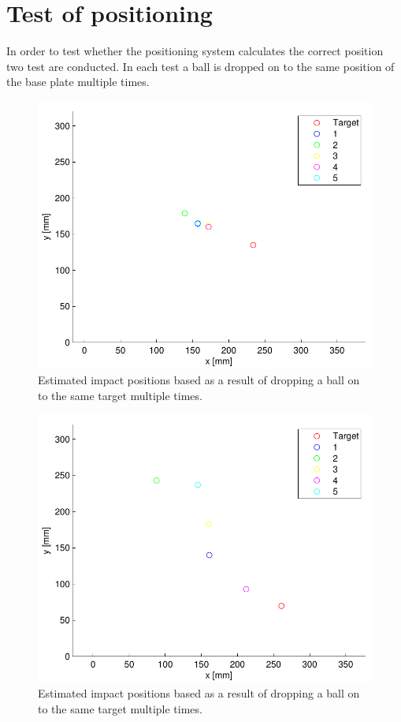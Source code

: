 \section{Test of positioning}
\label{test}
In order to test whether the positioning system calculates the correct position two test are conducted.
In each test a ball is dropped on to the same position of the base plate multiple times. 

\begin{figure}[htb]
	\centering
	\includegraphics[width=.8\textwidth]{figures/testRes30deg}
	\caption{Estimated impact positions based as a result of dropping a ball on to the same target multiple times.}
	\label{fig:testResult30Deg}
\end{figure}

\begin{figure}[htb]
	\centering
	\includegraphics[width=.8\textwidth]{figures/testRes15deg}
	\caption{Estimated impact positions based as a result of dropping a ball on to the same target multiple times.}
	\label{fig:testResult15Deg}
\end{figure}
